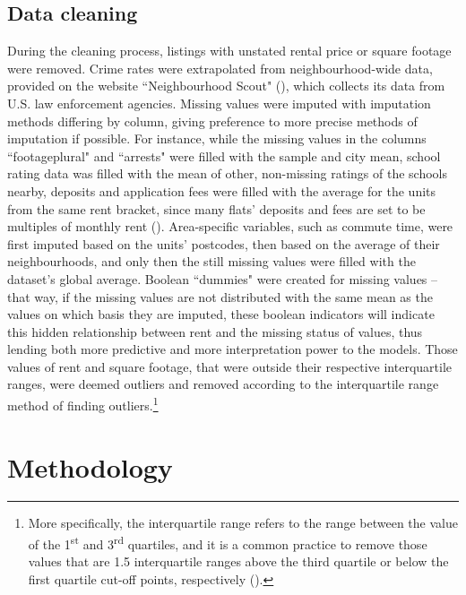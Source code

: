 \documentclass[12pt]{report}
\begin{document}
\subsection{Data cleaning}
During the cleaning process, listings with unstated rental price or square footage were removed. Crime rates were extrapolated from neighbourhood-wide data, provided on the website ``Neighbourhood Scout" (\cite{NeighbourhoodScoutCrime}), which collects its data from U.S. law enforcement agencies. Missing values were imputed with imputation methods differing by column, giving preference to more precise methods of imputation if possible. For instance, while the missing values in the columns ``footageplural" and ``arrests" were filled with the sample and city mean, school rating data was filled with the mean of other, non-missing ratings of the schools nearby, deposits and application fees were filled with the average for the units from the same rent bracket, since many flats' deposits and fees are set to be multiples of monthly rent (\cite{PocketSense}). Area-specific variables, such as commute time, were first imputed based on the units' postcodes, then based on the average of their neighbourhoods, and only then the still missing values were filled with the dataset's global average. Boolean ``dummies" were created for missing values -- that way, if the missing values are not distributed with the same mean as the values on which basis they are imputed, these boolean indicators will indicate this hidden relationship between rent and the missing status of values, thus lending both more predictive and more interpretation power to the models.
Those values of rent and square footage, that were outside their respective interquartile ranges, were deemed outliers and removed according to the interquartile range method of finding outliers.\footnote{More specifically, the interquartile range refers to the range between the value of the 1\textsuperscript{st} and 3\textsuperscript{rd} quartiles, and it is a common practice to remove those values that are 1.5 interquartile ranges above the third quartile or below the first quartile cut-off points, respectively (\cite{garlits2023}).}

\section{Methodology}
\end{document}
